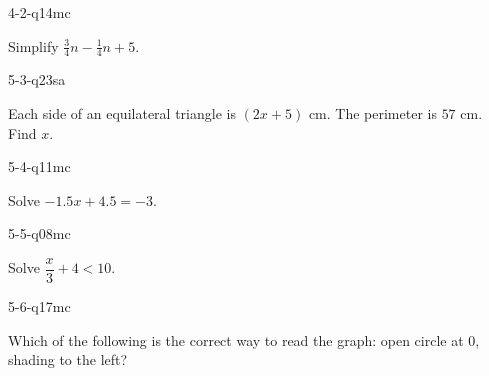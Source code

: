 \begin{practiceQuestion}{4-2-q14}{mc}
\begin{questionText}
Simplify $\frac{3}{4}n - \frac{1}{4}n + 5$.


\begin{center}
\hspace{1cm}
\end{center}
\end{questionText}
\end{practiceQuestion}

\begin{practiceQuestion}{5-3-q23}{sa}
\begin{questionText}
Each side of an equilateral triangle is $(2x + 5)$ cm. The perimeter is $57$ cm. Find $x$.
\end{questionText}
\end{practiceQuestion}

\begin{practiceQuestion}{5-4-q11}{mc}
\begin{questionText}
Solve $-1.5x + 4.5 = -3$.
\end{questionText}
\end{practiceQuestion}

\begin{practiceQuestion}{5-5-q08}{mc}
\begin{questionText}
Solve $\dfrac{x}{3} + 4 < 10$.
\end{questionText}
\end{practiceQuestion}

\begin{practiceQuestion}{5-6-q17}{mc}
\begin{questionText}
Which of the following is the correct way to read the graph: open circle at $0$, shading to the left?
\end{questionText}
\end{practiceQuestion}


